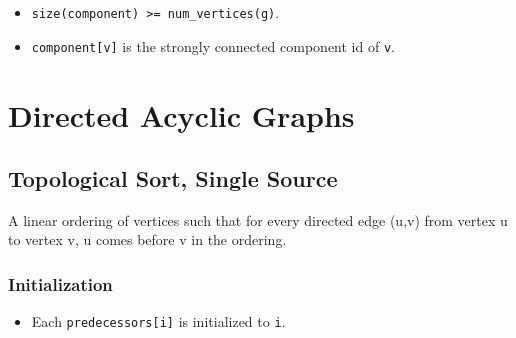 {\small
      
}



\begin{itemdescr}
      \pnum\preconditions
            \begin{itemize}
                  \item
                        \lstinline{size(component) >= num_vertices(g)}.
            \end{itemize}
      \pnum\effects
            \begin{itemize}
                  \item
                        \lstinline{component[v]} is the strongly connected component id of \lstinline{v}.
            \end{itemize}
\end{itemdescr}

\section{Directed Acyclic Graphs}
\subsection{Topological Sort, Single Source}
A linear ordering of vertices such that for every directed edge (u,v) from vertex u to vertex v, u comes before v in the ordering.

\subsubsection{Initialization}

{\small
      
}

\begin{itemdescr}
      \effects
      \begin{itemize}
            \item
                  Each \lstinline{predecessors[i]} is initialized to \lstinline{i}.
      \end{itemize}
\end{itemdescr}


